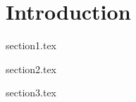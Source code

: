\documentclass[class=linearalgebra,crop=false]{standalone}
\begin{document}
\chapter{Introduction}

{section1.tex}

{section2.tex}

{section3.tex}
\end{document}
